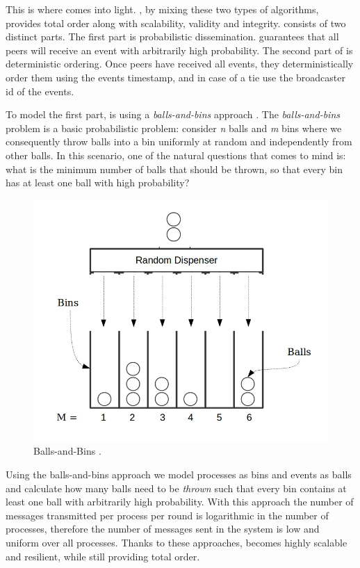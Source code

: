 \par
This is where \epto comes into light. \epto, by mixing these two types of algorithms, provides total order along with scalability, validity and integrity. 
\epto consists of two distinct parts. The first part is probabilistic dissemination. \epto guarantees that all peers will receive an event with arbitrarily high probability. The second part of \epto is deterministic ordering. Once peers have received all events, they deterministically order them using the events timestamp, and in case of a tie use the broadcaster id of the events.
\par
To model the first part, \epto is using a \textit{balls-and-bins} approach \autocite{Koldehofe02simplegossiping}. The \textit{balls-and-bins} problem is a basic probabilistic problem: consider \textit{n} balls and \textit{m} bins where we consequently throw balls into a bin uniformly at random and independently from other balls. In this scenario, one of the natural questions that comes to mind is: what is the minimum number of balls that should be thrown, so that every bin has at least one ball with high probability?
\begin{figure}
	\includegraphics[width=\linewidth]{figures/BnB.jpeg}
	\caption{Balls-and-Bins \autocite{bnb}.}
	\label{fig:balls-and-bins}
\end{figure}
\par
Using the balls-and-bins approach we model processes as bins and events as balls and calculate how many balls need to be \textit{thrown} such that every bin contains at least one ball with arbitrarily high probability. With this approach the number of messages transmitted per process per round is logarithmic in the number of processes, therefore the number of messages sent in the system is low and uniform over all processes. Thanks to these approaches, \epto becomes highly scalable and resilient, while still providing total order.

